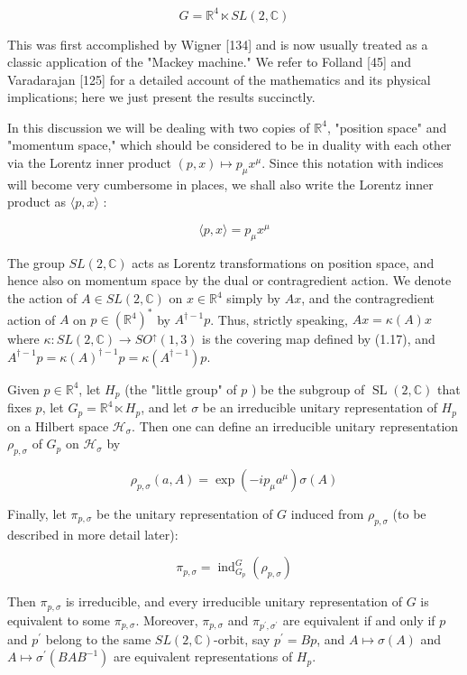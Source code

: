 \documentclass[10pt, letterpaper]{article}
\begin{document}
$$
G=\mathbb{R}^{4} \ltimes S L(2, \mathbb{C})
$$

This was first accomplished by Wigner [134] and is now usually treated as a classic application of the "Mackey machine." We refer to Folland [45] and Varadarajan [125] for a detailed account of the mathematics and its physical implications; here we just present the results succinctly.

In this discussion we will be dealing with two copies of $\mathbb{R}^{4}$, "position space" and "momentum space," which should be considered to be in duality with each other via the Lorentz inner product $(p, x) \mapsto p_{\mu} x^{\mu}$. Since this notation with indices will become very cumbersome in places, we shall also write the Lorentz inner product as $\langle p, x\rangle$ :

$$
\langle p, x\rangle=p_{\mu} x^{\mu}
$$

The group $S L(2, \mathbb{C})$ acts as Lorentz transformations on position space, and hence also on momentum space by the dual or contragredient action. We denote the action of $A \in S L(2, \mathbb{C})$ on $x \in \mathbb{R}^{4}$ simply by $A x$, and the contragredient action of $A$ on $p \in\left(\mathbb{R}^{4}\right)^{*}$ by $A^{\dagger-1} p$. Thus, strictly speaking, $A x=\kappa(A) x$ where $\kappa: S L(2, \mathbb{C}) \rightarrow S O^{\uparrow}(1,3)$ is the covering map defined by (1.17), and $A^{\dagger-1} p= \kappa(A)^{\dagger-1} p=\kappa\left(A^{\dagger-1}\right) p$.

Given $p \in \mathbb{R}^{4}$, let $H_{p}$ (the "little group" of $p$ ) be the subgroup of $\operatorname{SL}(2, \mathbb{C})$ that fixes $p$, let $G_{p}=\mathbb{R}^{4} \ltimes H_{p}$, and let $\sigma$ be an irreducible unitary representation of $H_{p}$ on a Hilbert space $\mathcal{H}_{\sigma}$. Then one can define an irreducible unitary representation $\rho_{p, \sigma}$ of $G_{p}$ on $\mathcal{H}_{\sigma}$ by

$$
\rho_{p, \sigma}(a, A)=\exp \left(-i p_{\mu} a^{\mu}\right) \sigma(A)
$$

Finally, let $\pi_{p, \sigma}$ be the unitary representation of $G$ induced from $\rho_{p, \sigma}$ (to be described in more detail later):

$$
\pi_{p, \sigma}=\operatorname{ind}_{G_{p}}^{G}\left(\rho_{p, \sigma}\right)
$$

Then $\pi_{p, \sigma}$ is irreducible, and every irreducible unitary representation of $G$ is equivalent to some $\pi_{p, \sigma}$. Moreover, $\pi_{p, \sigma}$ and $\pi_{p^{\prime}, \sigma^{\prime}}$ are equivalent if and only if $p$ and $p^{\prime}$ belong to the same $S L(2, \mathbb{C})$-orbit, say $p^{\prime}=B p$, and $A \mapsto \sigma(A)$ and $A \mapsto \sigma^{\prime}\left(B A B^{-1}\right)$ are equivalent representations of $H_{p}$.
\end{document}
